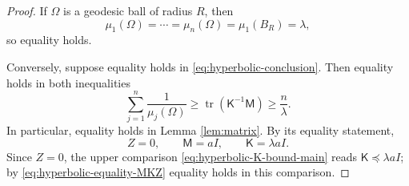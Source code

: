 \documentclass[10pt,a4paper]{amsart}
\DeclareMathOperator{\tr}{tr}
\newcommand{\Id}{I}
\newcommand{\mcM}{\mathsf M}
\newcommand{\mcK}{\mathsf K}
\begin{document}
\begin{proof}
If $\Omega$ is a geodesic ball of radius $R$, then
$$
        \mu_1(\Omega)=\cdots=\mu_n(\Omega)=\mu_1(B_R)=\lambda,
$$
so equality holds.

Conversely, suppose equality holds in \eqref{eq:hyperbolic-conclusion}.  Then equality holds in both inequalities
$$
        \sum_{j=1}^n\frac1{\mu_j(\Omega)}
        \ge \tr(\mcK^{-1}\mcM)
        \ge \frac{n}{\lambda}.
$$
In particular, equality holds in Lemma \ref{lem:matrix}.  By its equality statement,
\begin{equation}\label{eq:hyperbolic-equality-MKZ}
        Z=0,
        \qquad
        \mcM=a\Id,
        \qquad
        \mcK=\lambda a\Id.
\end{equation}
Since $Z=0$, the upper comparison \eqref{eq:hyperbolic-K-bound-main} reads $\mcK\preceq \lambda a\Id$; by \eqref{eq:hyperbolic-equality-MKZ} equality holds in this comparison.


\end{proof}
\end{document}
